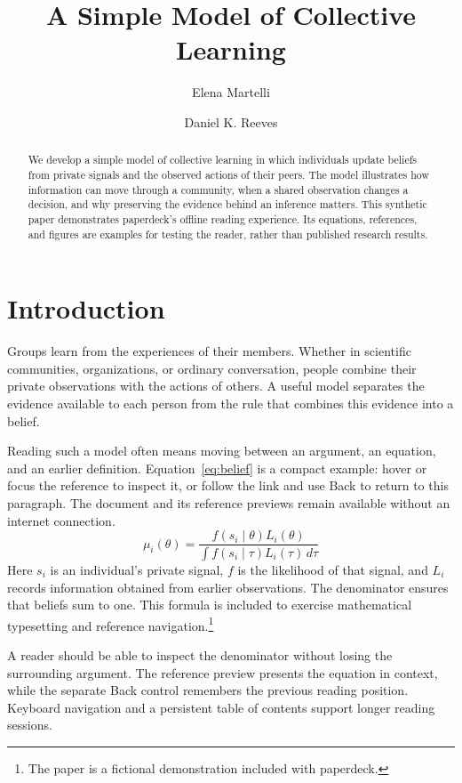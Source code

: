 \documentclass{article}
\title{A Simple Model of Collective Learning}
\author{Elena Martelli \and Daniel K. Reeves}
\begin{document}
\maketitle
\begin{abstract}
We develop a simple model of collective learning in which individuals update beliefs from private signals and the observed actions of their peers. The model illustrates how information can move through a community, when a shared observation changes a decision, and why preserving the evidence behind an inference matters. This synthetic paper demonstrates paperdeck's offline reading experience. Its equations, references, and figures are examples for testing the reader, rather than published research results.
\end{abstract}
\section{Introduction}\label{sec:intro}
Groups learn from the experiences of their members. Whether in scientific communities, organizations, or ordinary conversation, people combine their private observations with the actions of others. A useful model separates the evidence available to each person from the rule that combines this evidence into a belief.

Reading such a model often means moving between an argument, an equation, and an earlier definition. Equation~\eqref{eq:belief} is a compact example: hover or focus the reference to inspect it, or follow the link and use Back to return to this paragraph. The document and its reference previews remain available without an internet connection.
\begin{equation}
\mu_i(\theta) = \frac{f(s_i\mid\theta)L_i(\theta)}{\int f(s_i\mid\tau)L_i(\tau)\,d\tau}
\label{eq:belief}
\end{equation}
Here $s_i$ is an individual's private signal, $f$ is the likelihood of that signal, and $L_i$ records information obtained from earlier observations. The denominator ensures that beliefs sum to one. This formula is included to exercise mathematical typesetting and reference navigation.\footnote{The paper is a fictional demonstration included with paperdeck.}

A reader should be able to inspect the denominator without losing the surrounding argument. The reference preview presents the equation in context, while the separate Back control remembers the previous reading position. Keyboard navigation and a persistent table of contents support longer reading sessions.
\end{document}
